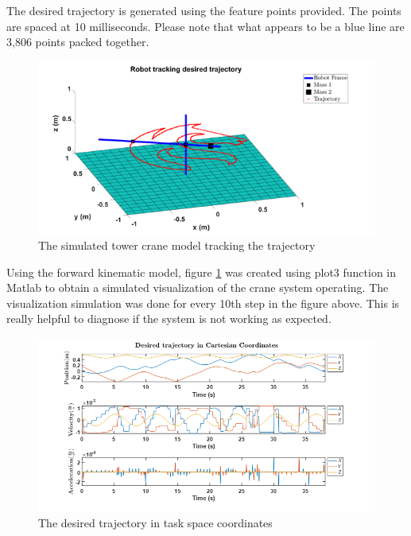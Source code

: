 \documentclass{UoNMCHA}
\numberwithin{equation}{section}
\begin{document}
	The desired trajectory is generated using the feature points provided. The points are spaced at 10 milliseconds. Please note that what appears to be a blue line are 3,806 points packed together.
	
	\begin{figure}[H]
		\begin{center}
			\includegraphics[width=.9\linewidth]{figs/Picture24}
			\caption{The simulated tower crane model tracking the trajectory}
			\label{figs/Picture24}
		\end{center}
	\end{figure}
	
	Using the forward kinematic model, figure \ref{figs/Picture24} was created using plot3 function in Matlab to obtain a simulated visualization of the crane system operating. The visualization simulation was done for every 10th step in the figure above. This is really helpful to diagnose if the system is not working as expected. 
	
	\begin{figure}[H]
		\begin{center}
			\includegraphics[width=1\linewidth]{figs/Picture25}
			\caption{The desired trajectory in task space coordinates}
			\label{figs/Picture25}
		\end{center}
	\end{figure}
	
\end{document}
